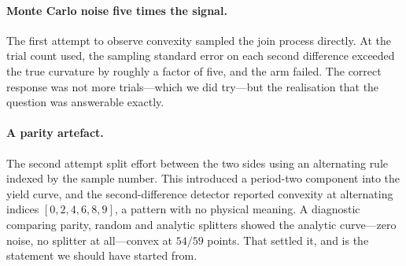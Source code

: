 \documentclass[11pt,twocolumn,a4paper]{article}
\theoremstyle{thmstyle}
\theoremstyle{definition}
\theoremstyle{remark}
\begin{document}
\paragraph{Monte Carlo noise five times the signal.} The first attempt to
observe convexity sampled the join process directly. At the trial count
used, the sampling standard error on each second difference exceeded the
true curvature by roughly a factor of five, and the arm failed. The
correct response was not more trials---which we did try---but the
realisation that the question was answerable exactly.

\paragraph{A parity artefact.} The second attempt split effort between
the two sides using an alternating rule indexed by the sample number.
This introduced a period-two component into the yield curve, and the
second-difference detector reported convexity at alternating indices
$[0,2,4,6,8,9]$, a pattern with no physical meaning. A diagnostic
comparing parity, random and analytic splitters showed the analytic
curve---zero noise, no splitter at all---convex at $54/59$ points. That
settled it, and  is the statement we should have
started from.
\end{document}
